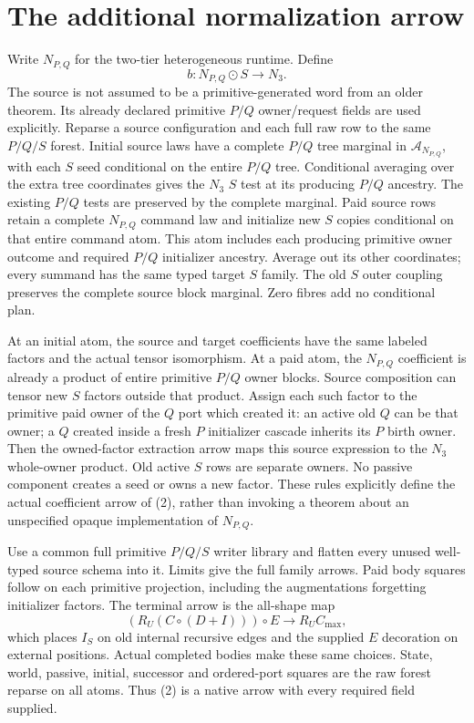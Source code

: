 \documentclass[11pt]{article}\usepackage{amsmath,amssymb,amsthm,geometry}\geometry{margin=1in}\newtheorem{theorem}{Theorem}
\begin{document}
\section{The additional normalization arrow}
Write $N_{P,Q}$ for the two-tier heterogeneous runtime. Define
\[
 b:N_{P,Q}\odot S\longrightarrow N_3.                \tag{2}
\]
The source is not assumed to be a primitive-generated word from an older theorem. Its already declared primitive $P/Q$ owner/request fields are used explicitly. Reparse a source configuration and each full raw row to the same $P/Q/S$ forest. Initial source laws have a complete $P/Q$ tree marginal in $\mathcal A_{N_{P,Q}}$, with each $S$ seed conditional on the entire $P/Q$ tree. Conditional averaging over the extra tree coordinates gives the $N_3$ $S$ test at its producing $P/Q$ ancestry. The existing $P/Q$ tests are preserved by the complete marginal. Paid source rows retain a complete $N_{P,Q}$ command law and initialize new $S$ copies conditional on that entire command atom. This atom includes each producing primitive owner outcome and required $P/Q$ initializer ancestry. Average out its other coordinates; every summand has the same typed target $S$ family. The old $S$ outer coupling preserves the complete source block marginal. Zero fibres add no conditional plan.

At an initial atom, the source and target coefficients have the same labeled factors and the actual tensor isomorphism. At a paid atom, the $N_{P,Q}$ coefficient is already a product of entire primitive $P/Q$ owner blocks. Source composition can tensor new $S$ factors outside that product. Assign each such factor to the primitive paid owner of the $Q$ port which created it: an active old $Q$ can be that owner; a $Q$ created inside a fresh $P$ initializer cascade inherits its $P$ birth owner. Then the owned-factor extraction arrow maps this source expression to the $N_3$ whole-owner product. Old active $S$ rows are separate owners. No passive component creates a seed or owns a new factor. These rules explicitly define the actual coefficient arrow of (2), rather than invoking a theorem about an unspecified opaque implementation of $N_{P,Q}$.

Use a common full primitive $P/Q/S$ writer library and flatten every unused well-typed source schema into it. Limits give the full family arrows. Paid body squares follow on each primitive projection, including the augmentations forgetting initializer factors. The terminal arrow is the all-shape map
\[
 (R_U(C\circ(D+I)))\circ E\longrightarrow R_UC_{\max}, \tag{3}
\]
which places $I_S$ on old internal recursive edges and the supplied $E$ decoration on external positions. Actual completed bodies make these same choices. State, world, passive, initial, successor and ordered-port squares are the raw forest reparse on all atoms. Thus (2) is a native arrow with every required field supplied.
\end{document}
